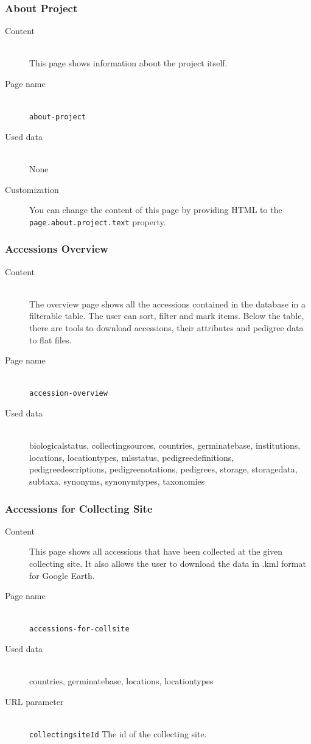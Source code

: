 \subsubsection{About Project}
\begin{description}
	\item[Content]\hfill\\This page shows information about the project itself.
	\item[Page name]\hfill\\\texttt{about-project}
	\item[Used data]\hfill\\None
	\item[Customization] You can change the content of this page by providing HTML to the \texttt{page.\allowbreak about.\allowbreak project.\allowbreak text} property.
\end{description}

\subsubsection{Accessions Overview}
\begin{description}
	\item[Content]\hfill\\The overview page shows all the accessions contained in the {\germinate} database in a filterable table. The user can sort, filter and mark items. Below the table, there are tools to download accessions, their attributes and pedigree data to flat files.
	\item[Page name]\hfill\\\texttt{accession-overview}
	\item[Used data]\hfill\\biologicalstatus, collectingsources, countries, germinatebase, institutions, locations, locationtypes, mlsstatus, pedigreedefinitions, pedigreedescriptions, pedigreenotations, pedigrees, storage, storagedata, subtaxa, synonyms, synonymtypes, taxonomies 
\end{description}

\subsubsection{Accessions for Collecting Site}
\begin{description}
	\item[Content] This page shows all accessions that have been collected at the given collecting site. It also allows the user to download the data in .kml format for Google Earth.
	\item[Page name]\hfill\\\texttt{accessions-for-collsite}
	\item[Used data]\hfill\\countries, germinatebase, locations, locationtypes
	\item[URL parameter]\hfill\\\texttt{collectingsiteId} The id of the collecting site.
\end{description}

